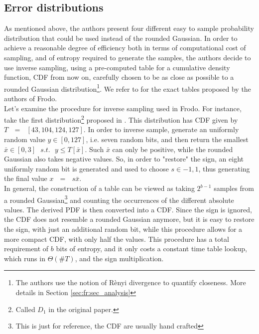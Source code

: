 \subsection{Error distributions}
As mentioned above, the authors present four different easy to sample probability distribution that could be used instead of the rounded Gaussian. In order to achieve a reasonable degree of efficiency both in terms of computational cost of sampling, and of entropy required to generate the samples, the authors decide to use inverse sampling, using a pre-computed table for a cumulative density function, CDF from now on, carefully chosen to be as close as possible to a rounded Gaussian distribution\footnote{The authors use the notion of R\`enyi divergence to quantify closeness. More details in Section \ref{sec:fr:sec_analysis}}. We refer to \cite{frodo} for the exact tables proposed by the authors of Frodo.\\
Let's examine the procedure for inverse sampling used in Frodo. For instance, take the first distribution\footnote{Called $D_1$ in the original paper.} proposed in \cite{frodo}. This distribution has CDF given by $T\text{ }=\text{ }[43,104,124,127]$. In order to inverse sample, generate an uniformly random value $y\in[0,127]$, i.e. seven random bits, and then return the smallest $\bar{x} \in [0,3]\text{ }s.t.\text{ }y\le T[\bar{x}]$. Such $\bar{x}$ can only be positive, while the rounded Gaussian also takes negative values. So, in order to "restore" the sign, an eight uniformly random bit is generated and used to choose $s\in{-1,1}$, thus generating the final value $x\text{ }=\text{ }s\bar{x}$.\\
In general, the construction of a table can be viewed as taking $2^{b-1}$ samples from a rounded Gaussian\footnote{This is just for reference, the CDF are usually hand crafted} and counting the occurrences of the different absolute values. The derived PDF is then converted into a CDF. Since the sign is ignored, the CDF does not resemble a rounded Gaussian anymore, but it is easy to restore the sign, with just an additional random bit, while this procedure allows for a more compact CDF, with only half the values. This procedure has a total requirement of $b$ bits of entropy, and it only costs a constant time table lookup, which runs in $\Theta(\#T)$, and the sign multiplication.\\ 

